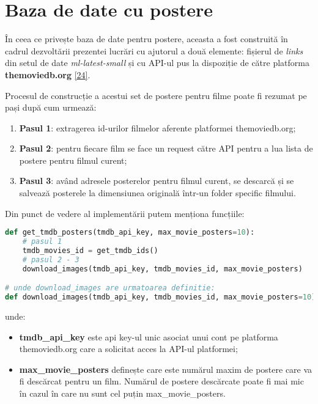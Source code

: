 \section{Baza de date cu postere}
În ceea ce privește baza de date pentru postere, aceasta a fost construită în cadrul dezvoltării prezentei lucrări cu ajutorul a două elemente: fișierul de \textit{links} din setul de date \textit{ml-latest-small} și cu API-ul pus la dispoziție de către platforma \textbf{themoviedb.org} \hyperlink{themoviedb}{[24]}.

Procesul de construcție a acestui set de postere pentru filme poate fi rezumat pe pași după cum urmează:
\begin{enumerate}
	\item \textbf{Pasul 1}: extragerea id-urilor filmelor aferente platformei themoviedb.org;
	\item \textbf{Pasul 2}: pentru fiecare film se face un request către API pentru a lua lista de postere pentru filmul curent;
	\item \textbf{Pasul 3}: având adresele posterelor pentru filmul curent, se descarcă și se salvează posterele la dimensiunea originală într-un folder specific filmului.
\end{enumerate}
Din punct de vedere al implementării putem menționa funcțiile:
\begin{lstlisting}[language=Python, caption=Construcția setului de date cu postere]
def get_tmdb_posters(tmdb_api_key, max_movie_posters=10):
    # pasul 1    
    tmdb_movies_id = get_tmdb_ids()
    # pasul 2 - 3
    download_images(tmdb_api_key, tmdb_movies_id, max_movie_posters)

# unde download_images are urmatoarea definitie:
def download_images(tmdb_api_key, tmdb_movies_id, max_movie_posters=10):
\end{lstlisting}
unde:
\begin{itemize}
	\item \textbf{tmdb\_api\_key} este api key-ul unic asociat unui cont pe platforma themoviedb.org care a solicitat acces la API-ul platformei;
	\item \textbf{max\_movie\_posters} definește care este numărul maxim de postere care va fi descărcat pentru un film. Numărul de postere descărcate poate fi mai mic în cazul în care nu sunt cel puțin max\_movie\_posters.
\end{itemize}

